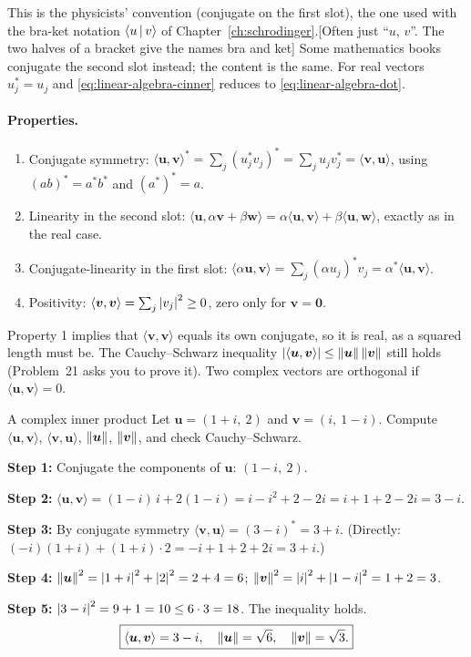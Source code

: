 This is the physicists' convention (conjugate on the first slot), the one used with the bra-ket notation $\langle u\,|\,v\rangle$ of Chapter~\ref{ch:schrodinger}.[Often just ``$u$, $v$''. The two halves of a bracket give the names bra and ket] Some mathematics books conjugate the second slot instead; the content is the same. For real vectors $u_j^*=u_j$ and \cref{eq:linear-algebra-cinner} reduces to \cref{eq:linear-algebra-dot}.

\paragraph{Properties.}
\begin{enumerate}
\item Conjugate symmetry: $\langle\bm u,\bm v\rangle^*=\sum_j(u_j^*v_j)^*=\sum_ju_jv_j^*=\langle\bm v,\bm u\rangle$, using $(ab)^*=a^*b^*$ and $(a^*)^*=a$.
\item Linearity in the second slot: $\langle\bm u,\alpha\bm v+\beta\bm w\rangle=\alpha\langle\bm u,\bm v\rangle+\beta\langle\bm u,\bm w\rangle$, exactly as in the real case.
\item Conjugate-linearity in the first slot: $\langle\alpha\bm u,\bm v\rangle=\sum_j(\alpha u_j)^*v_j=\alpha^*\langle\bm u,\bm v\rangle$.
\item Positivity: $\langle\bm v,\bm v\rangle=\sum_j\left\lvert v_j\right\rvert^2\ge0$, zero only for $\bm v=\bm 0$.
\end{enumerate}
Property 1 implies that $\langle\bm v,\bm v\rangle$ equals its own conjugate, so it is real, as a squared length must be. The Cauchy--Schwarz inequality $\left\lvert \langle\bm u,\bm v\rangle\right\rvert\le\left\lVert \bm u\right\rVert\left\lVert \bm v\right\rVert$ still holds (Problem~21 asks you to prove it). Two complex vectors are orthogonal if $\langle\bm u,\bm v\rangle=0$.

\begin{sample}{A complex inner product}
Let $\bm u=(1+i,\ 2)$ and $\bm v=(i,\ 1-i)$. Compute $\langle\bm u,\bm v\rangle$, $\langle\bm v,\bm u\rangle$, $\left\lVert \bm u\right\rVert$, $\left\lVert \bm v\right\rVert$, and check Cauchy--Schwarz.

\textbf{Step 1:} Conjugate the components of $\bm u$: $(1-i,\ 2)$.

\textbf{Step 2:} $\langle\bm u,\bm v\rangle=(1-i)\,i+2(1-i)=i-i^2+2-2i=i+1+2-2i=3-i$.

\textbf{Step 3:} By conjugate symmetry $\langle\bm v,\bm u\rangle=(3-i)^*=3+i$. (Directly: $(-i)(1+i)+(1+i)\cdot2=-i+1+2+2i=3+i$.)

\textbf{Step 4:} $\left\lVert \bm u\right\rVert^2=\left\lvert 1+i\right\rvert^2+\left\lvert 2\right\rvert^2=2+4=6$; $\left\lVert \bm v\right\rVert^2=\left\lvert i\right\rvert^2+\left\lvert 1-i\right\rvert^2=1+2=3$.

\textbf{Step 5:} $\left\lvert 3-i\right\rvert^2=9+1=10\le6\cdot3=18$. The inequality holds.
\[
\boxed{\langle\bm u,\bm v\rangle=3-i,\quad \left\lVert \bm u\right\rVert=\sqrt6,\quad\left\lVert \bm v\right\rVert=\sqrt3.}
\]
\end{sample}

